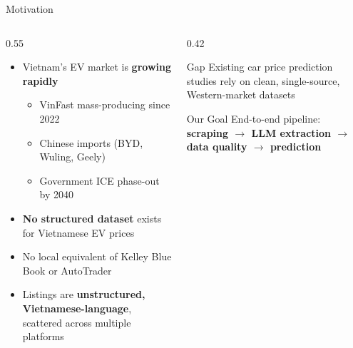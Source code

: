 \documentclass[aspectratio=169]{beamer}
\begin{document}
    \begin{frame}{Motivation}
        \begin{columns}[T]
            \begin{column}{0.55\textwidth}
                \begin{itemize}
                    \item Vietnam's EV market is \textbf{growing rapidly}
                    \begin{itemize}
                        \item VinFast mass-producing since 2022
                        \item Chinese imports (BYD, Wuling, Geely)
                        \item Government ICE phase-out by 2040
                    \end{itemize}
                    \item \textbf{No structured dataset} exists for Vietnamese EV prices
                    \item No local equivalent of Kelley Blue Book or AutoTrader
                    \item Listings are \textbf{unstructured, Vietnamese-language}, scattered across multiple platforms
                \end{itemize}
            \end{column}
            \begin{column}{0.42\textwidth}
                \begin{block}{Gap}
                    Existing car price prediction studies rely on clean, single-source, Western-market datasets
                \end{block}
                \vspace{0.5em}
                \begin{block}{Our Goal}
                    End-to-end pipeline: \textbf{scraping $\to$ LLM extraction $\to$ data quality $\to$ prediction}
                \end{block}
            \end{column}
        \end{columns}
    \end{frame}
\end{document}
